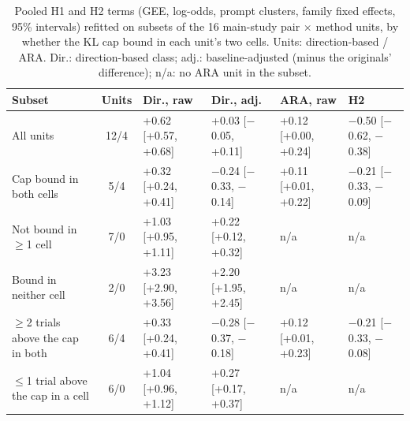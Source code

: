 \begin{table}[t]
\centering\footnotesize
\setlength{\tabcolsep}{2.5pt}
\caption{Pooled H1 and H2 terms (GEE, log-odds, prompt clusters, family fixed effects, 95\% intervals) refitted on
subsets of the 16 main-study pair $\times$ method units, by whether the KL cap bound in each unit's two cells. Units:
direction-based / ARA. Dir.: direction-based class; adj.: baseline-adjusted (minus the originals' difference); n/a:
no ARA unit in the subset.}
\label{tab:kl-cap-subsets}
\begin{tabular}{@{}lcllll@{}}
\toprule
Subset & Units & Dir., raw & Dir., adj. & ARA, raw & H2 \\
\midrule
All units & 12/4 & +0.62 [+0.57, +0.68] & +0.03 [$-$0.05, +0.11] & +0.12 [+0.00, +0.24] & $-$0.50 [$-$0.62, $-$0.38] \\
Cap bound in both cells & 5/4 & +0.32 [+0.24, +0.41] & $-$0.24 [$-$0.33, $-$0.14] & +0.11 [+0.01, +0.22] & $-$0.21 [$-$0.33, $-$0.09] \\
Not bound in $\ge$1 cell & 7/0 & +1.03 [+0.95, +1.11] & +0.22 [+0.12, +0.32] & n/a & n/a \\
Bound in neither cell & 2/0 & +3.23 [+2.90, +3.56] & +2.20 [+1.95, +2.45] & n/a & n/a \\
$\ge$2 trials above the cap in both & 6/4 & +0.33 [+0.24, +0.41] & $-$0.28 [$-$0.37, $-$0.18] & +0.12 [+0.01, +0.23] & $-$0.21 [$-$0.33, $-$0.08] \\
$\le$1 trial above the cap in a cell & 6/0 & +1.04 [+0.96, +1.12] & +0.27 [+0.17, +0.37] & n/a & n/a \\
\bottomrule
\end{tabular}
\end{table}

